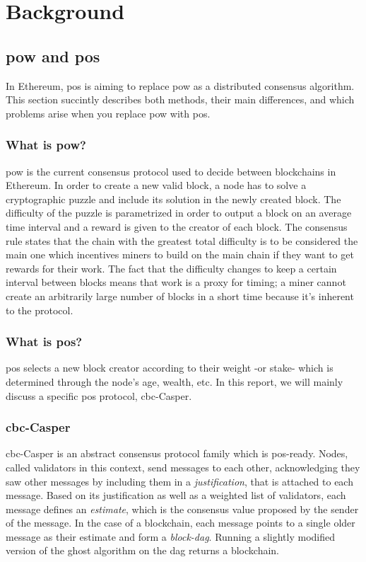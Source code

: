 \chapter{Background}
\label{chap:background}

\section{\gls{pow} and \gls{pos}}
In Ethereum, \gls{pos} is aiming to replace \gls{pow} as a distributed consensus
algorithm. This section succintly describes both methods, their main
differences, and which problems arise when you replace \gls{pow} with \gls{pos}.

\subsection{What is \gls{pow}?}
\gls{pow} is the current consensus protocol used to decide between blockchains
in Ethereum. In order to create a new valid block, a node has to solve a
cryptographic puzzle and include its solution in the newly created block. The
difficulty of the puzzle is parametrized in order to output a block on an
average time interval and a reward is given to the creator of each block.  The
consensus rule states that the chain with the greatest total difficulty is to be
considered the main one which incentives miners to build on the main chain if
they want to get rewards for their work. The fact that the difficulty changes to
keep a certain interval between blocks means that work is a proxy for timing; a
miner cannot create an arbitrarily large number of blocks in a short time
because it's inherent to the protocol.


\subsection{What is \gls{pos}?}
\gls{pos} selects a new block creator according to their weight -or stake- which
is determined through the node's age, wealth, etc. In this report, we will
mainly discuss a specific \gls{pos} protocol, \gls{cbc}-Casper.

\subsection{\gls{cbc}-Casper}
\label{ssec:cbc}
\FloatBarrier
\gls{cbc}-Casper \cite{abstractCBC} \cite{abstractCBC2} is an abstract consensus
protocol family which is \gls{pos}-ready. Nodes, called validators in this
context, send messages to each other, acknowledging they saw other messages by
including them in a \textit{justification}, that is attached to each message.
Based on its justification as well as a weighted list of validators, each
message defines an \textit{estimate}, which is the consensus value proposed by
the sender of the message. In the case of a blockchain, each message points to a
single older message as their estimate and form a \textit{block-\gls{dag}}. Running
a slightly modified version of the \gls{ghost} algorithm on the \gls{dag}
\cite{abstractCBC} \cite{GHOST} returns a blockchain.

